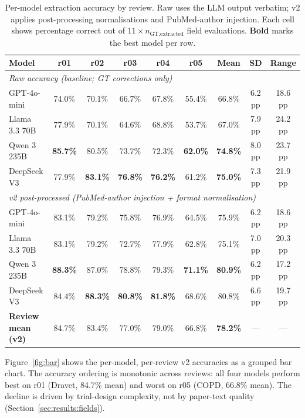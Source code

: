 \documentclass[a4paper,fleqn]{cas-sc}
\begin{document}
\begin{table}[t]
\caption{Per-model extraction accuracy by review. Raw uses the LLM
output verbatim; v2 applies post-processing normalisations and
PubMed-author injection. Each cell shows percentage correct out of
$11 \times n_\textrm{GT,extracted}$ field evaluations.
\textbf{Bold} marks the best model per row.}
\label{tbl:overall}
\begin{tabular*}{\tblwidth}{@{}p{2.0cm}cccccccc@{}}
\toprule
Model & r01 & r02 & r03 & r04 & r05 & Mean & SD & Range \\
\midrule
\multicolumn{9}{l}{\textit{Raw accuracy (baseline; GT corrections only)}} \\[1pt]
GPT-4o-mini      & 74.0\% & 70.1\% & 66.7\% & 67.8\% & 55.4\% & 66.8\% & 6.2 pp & 18.6 pp \\
Llama 3.3 70B    & 77.9\% & 70.1\% & 64.6\% & 68.8\% & 53.7\% & 67.0\% & 7.9 pp & 24.2 pp \\
Qwen 3 235B      & \textbf{85.7\%} & 80.5\% & 73.7\% & 72.3\% & \textbf{62.0\%} & \textbf{74.8\%} & 8.0 pp & 23.7 pp \\
DeepSeek V3      & 77.9\% & \textbf{83.1\%} & \textbf{76.8\%} & \textbf{76.2\%} & 61.2\% & \textbf{75.0\%} & 7.3 pp & 21.9 pp \\
\midrule
\multicolumn{9}{l}{\textit{v2 post-processed (PubMed-author injection + format normalisation)}} \\[1pt]
GPT-4o-mini      & 83.1\% & 79.2\% & 75.8\% & 76.9\% & 64.5\% & 75.9\% & 6.2 pp & 18.6 pp \\
Llama 3.3 70B    & 83.1\% & 79.2\% & 72.7\% & 77.9\% & 62.8\% & 75.1\% & 7.0 pp & 20.3 pp \\
Qwen 3 235B      & \textbf{88.3\%} & 87.0\% & 78.8\% & 79.3\% & \textbf{71.1\%} & \textbf{80.9\%} & 6.2 pp & 17.2 pp \\
DeepSeek V3      & 84.4\% & \textbf{88.3\%} & \textbf{80.8\%} & \textbf{81.8\%} & 68.6\% & 80.8\% & 6.6 pp & 19.7 pp \\
\midrule
\textbf{Review mean (v2)} & 84.7\% & 83.4\% & 77.0\% & 79.0\% & 66.8\% & \textbf{78.2\%} & --- & --- \\
\bottomrule
\end{tabular*}
\end{table}

Figure~\ref{fig:bar} shows the per-model, per-review v2 accuracies as a
grouped bar chart. The accuracy ordering is monotonic across reviews:
all four models perform best on r01 (Dravet, 84.7\% mean) and worst on
r05 (COPD, 66.8\% mean). The decline is driven by trial-design
complexity, not by paper-text quality (Section~\ref{sec:results:fields}).
\end{document}
